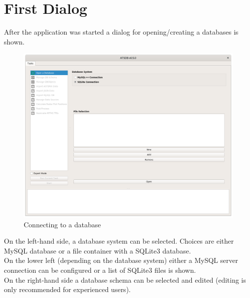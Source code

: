 \section{First Dialog}

After the application was started a dialog for opening/creating a databases is shown. 

\begin{figure}[H]
  \hspace*{-2cm}
    \includegraphics[width=18cm,frame]{../screenshots/db_config_connect.png}
  \caption{Connecting to a database}
  \label{fig:db_connect}
\end{figure}

On the left-hand side, a database system can be selected.  Choices are either MySQL database or a file container with a SQLite3 database. \\
On the lower left (depending on the database system) either a MySQL server connection can be configured or a list of SQLite3 files is shown.\\

On the right-hand side a database schema can be selected and edited (editing is only recommended for experienced users). 
